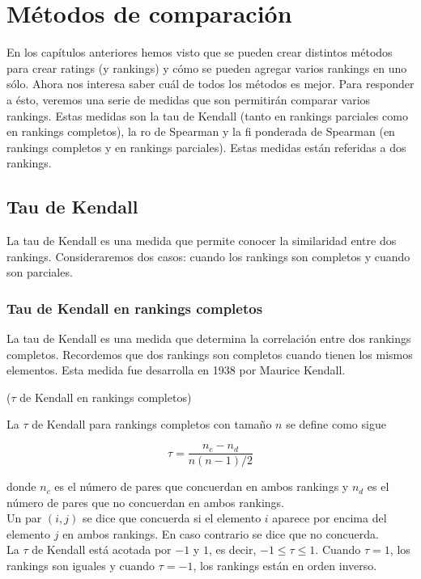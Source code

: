 \chapter{Métodos de comparación}

En los capítulos anteriores hemos visto que se pueden crear distintos métodos para crear ratings (y rankings) y cómo se pueden agregar varios rankings en uno sólo. Ahora nos interesa saber cuál de todos los métodos es mejor. Para responder a ésto, veremos una serie de medidas que son permitirán comparar varios rankings. Estas medidas son la tau de Kendall (tanto en rankings parciales como en rankings completos), la ro de Spearman y la fi ponderada de Spearman (en rankings completos y en rankings parciales). Estas medidas están referidas a dos rankings.

\section{Tau de Kendall}

La tau de Kendall es una medida que permite conocer la similaridad entre dos rankings. Consideraremos dos casos: cuando los rankings son completos y cuando son parciales.

\subsection{Tau de Kendall en rankings completos}

La tau de Kendall es una medida que determina la correlación entre dos rankings completos. Recordemos que dos rankings son completos cuando tienen los mismos elementos. Esta medida fue desarrolla en 1938 por Maurice Kendall.\\

\begin{defi}($\tau$ de Kendall en rankings completos) 

La $\tau$ de Kendall para rankings completos con tamaño $n$ se define como sigue

\begin{equation} \label{def:tau_kendall}
\tau = \dfrac{n_c - n_d}{n(n-1)/2}
\end{equation}

donde $n_c$ es el número de pares que concuerdan en ambos rankings y $n_d$ es el número de pares que no concuerdan en ambos rankings.\\

Un par $(i,j)$ se dice que concuerda si el elemento $i$ aparece por encima del elemento $j$ en ambos rankings. En caso contrario se dice que no concuerda.\\


La $\tau$ de Kendall está acotada por $-1$ y $1$, es decir, $-1 \leq \tau \leq 1$. Cuando $\tau = 1$, los rankings son iguales y cuando $\tau = -1$, los rankings están en orden inverso.  
\end{defi}

